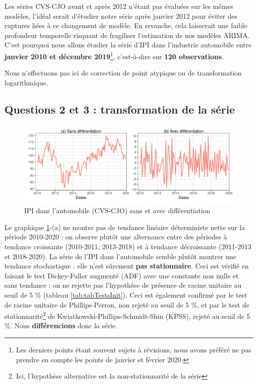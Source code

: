 \documentclass[,french]{article}
\let\rmarkdownfootnote\footnote%
\def\footnote{\protect\rmarkdownfootnote}
\begin{document}
Les séries CVS-CJO avant et après 2012 n'étant pas évaluées sur les mêmes modèles, l'idéal serait d'étudier notre série après janvier 2012 pour éviter des ruptures liées à ce changement de modèle. En revanche, cela laisserait une faible profondeur temporelle risquant de fragiliser l'estimation de nos modèles ARIMA.
C'est pourquoi nous allons étudier la série d'IPI dans l'industrie automobile entre \textbf{janvier 2010 et décembre 2019}\footnote{Les derniers points étant souvent sujets à révisions, nous avons préféré ne pas prendre en compte les points de janvier et février 2020.}, c'est-à-dire sur \textbf{120 observations}.

Nous n'effectuons pas ici de correction de point atypique ou de transformation logarithmique.

\hypertarget{questions-2-et-3-transformation-de-la-suxe9rie}{%
\subsection{Questions 2 et 3 : transformation de la série}\label{questions-2-et-3-transformation-de-la-suxe9rie}}

\begin{figure}

{\centering \includegraphics{img/rmd-compGraph-1} 

}

\caption{IPI dans l'automobile (CVS-CJO) sans et avec différentiation}\label{fig:compGraph}
\end{figure}

Le graphique \ref{fig:compGraph}-(a) ne montre pas de tendance linéaire déterministe nette sur la période 2010-2020 : on observe plutôt une alternance entre des périodes à tendance croissante (2010-2011, 2013-2018) et à tendance décroissante (2011-2013 et 2018-2020).
La série de l'IPI dans l'automobile semble plutôt montrer une tendance stochastique : elle n'est sûrement \textbf{pas stationnaire}. Ceci est vérifié en faisant le test Dickey-Fuller augmenté (ADF) avec une constante non nulle et sans tendance : on ne rejette pas l'hypothèse de présence de racine unitaire au seuil de 5 \% (tableau \ref{tab:tabTestsInit}).
Ceci est également confirmé par le test de racine unitaire de Phillips-Perron, non rejeté au seuil de 5 \%, et par le test de stationnarité\footnote{Ici, l'hypothèse alternative est la non-stationnarité de la série} de Kwiatkowski-Phillips-Schmidt-Shin (KPSS), rejeté au seuil de 5 \%. Nous \textbf{différencions} donc la série.
\end{document}
